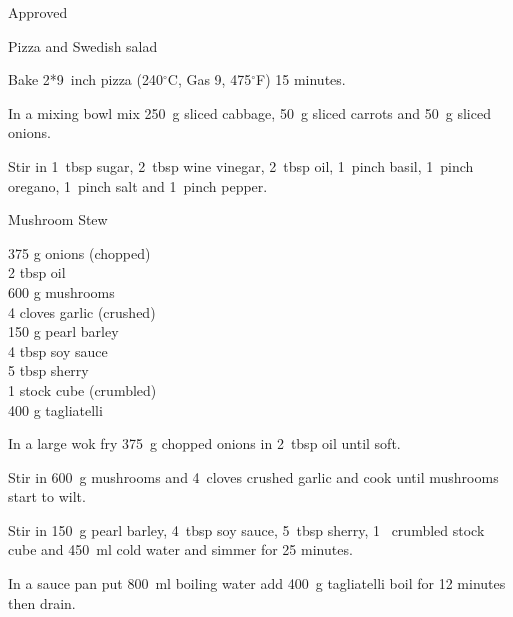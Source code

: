 \begin{menu}{Approved}
\begin{recipe}{1}{Pizza and Swedish salad}
\begin{ingredients}
		\end{ingredients}
	
	
    \begin{instructions}
    \item 
        Bake 2*9~inch  pizza
      (240$^{\circ}$C, Gas 9, 475$^{\circ}$F)
     15 minutes.
      \item 
        In a mixing bowl mix
        250~g sliced cabbage,
        50~g sliced carrots
        and
        50~g sliced onions.
      \item 
        Stir in
        1~tbsp  sugar,
        2~tbsp  wine vinegar,
        2~tbsp  oil,
        1~pinch  basil,
        1~pinch  oregano,
        1~pinch  salt
        and
        1~pinch  pepper.
      
    \end{instructions}
    \end{recipe}%
  
    \begin{recipe}{2}{Mushroom Stew}%
    
		\begin{ingredients}
		375 g onions (chopped) \\
	2 tbsp oil  \\
	600 g mushrooms  \\
	4 cloves garlic (crushed) \\
	150 g pearl barley  \\
	4 tbsp soy sauce  \\
	5 tbsp sherry  \\
	1  stock cube (crumbled) \\
	400 g tagliatelli  \\
	
		\end{ingredients}
	
	
    \begin{instructions}
    \item 
        In a large wok fry
        375~g chopped onions
        in
        2~tbsp  oil
        until soft.
      \item 
        Stir in
        600~g  mushrooms
        and
        4~cloves crushed garlic
        and cook until mushrooms start to wilt.
      \item 
        Stir in
        150~g  pearl barley,
        4~tbsp  soy sauce,
        5~tbsp  sherry,
        1~ crumbled stock cube
        and
        450~ml  cold water
        and simmer for 25 minutes.
      \item 
      In a
      sauce pan
      put
      800~ml  boiling water
      add
      400~g  tagliatelli
      boil for 12 minutes then drain.
    

\end{instructions}
\end{recipe}
\end{menu}
